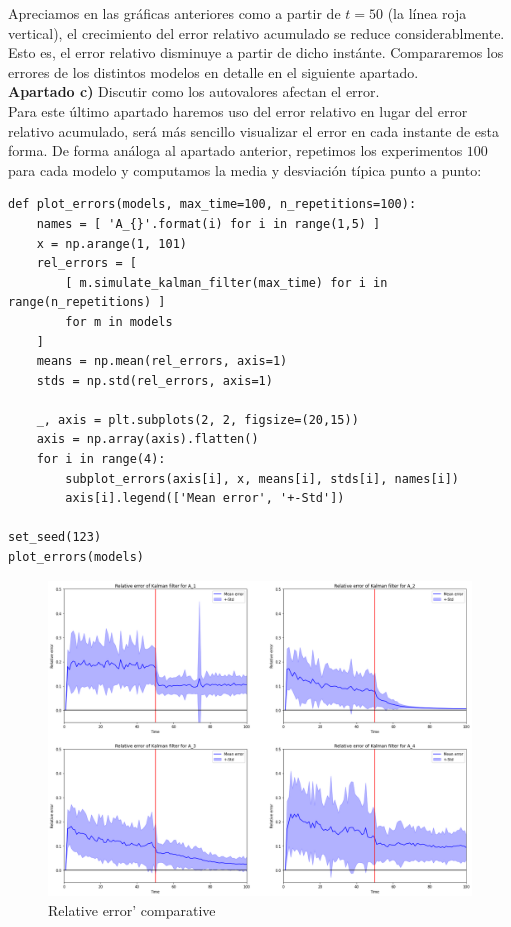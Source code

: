 \documentclass[a4paper]{article}
\begin{document}
Apreciamos en las gráficas anteriores como a partir de $t=50$ (la línea roja vertical), el crecimiento del error relativo acumulado se reduce considerablmente. Esto es, el error relativo disminuye a partir de dicho instánte. Compararemos los errores de los distintos modelos en detalle en el siguiente apartado. \\

\textbf{Apartado c)} Discutir como los autovalores afectan el error. \\

Para este último apartado haremos uso del error relativo en lugar del error relativo acumulado, será más sencillo visualizar el error en cada instante de esta forma. De forma análoga al apartado anterior, repetimos los experimentos $100$ para cada modelo y computamos la media y desviación típica punto a punto:

\begin{verbatim}
def plot_errors(models, max_time=100, n_repetitions=100):
	names = [ 'A_{}'.format(i) for i in range(1,5) ]
	x = np.arange(1, 101)
	rel_errors = [
		[ m.simulate_kalman_filter(max_time) for i in range(n_repetitions) ]
		for m in models
	]
	means = np.mean(rel_errors, axis=1)
	stds = np.std(rel_errors, axis=1)
	
	_, axis = plt.subplots(2, 2, figsize=(20,15))  
	axis = np.array(axis).flatten()
	for i in range(4):
		subplot_errors(axis[i], x, means[i], stds[i], names[i])
		axis[i].legend(['Mean error', '+-Std'])

set_seed(123)
plot_errors(models)
\end{verbatim}

\begin{figure}[H]
	\includegraphics[scale=.6]{figures/kalman1}
	\centering
	\caption{Relative error' comparative}
\end{figure}
\end{document}
